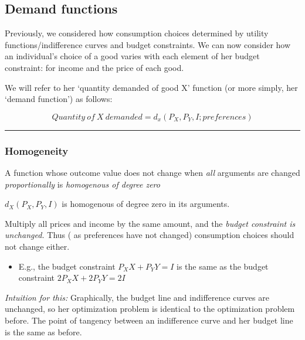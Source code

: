 \documentclass[]{article}
\providecommand{\tightlist}{%
  \setlength{\itemsep}{0pt}\setlength{\parskip}{0pt}}
\begin{document}
\hypertarget{demand-functions}{%
\subsection{Demand functions}\label{demand-functions}}

Previously, we considered how consumption choices determined by utility
functions/indifference curves and budget constraints. We can now
consider how an individual's choice of a good varies with each element
of her budget constraint: for income and the price of each good.

We will refer to her `quantity demanded of good X' function (or more
simply, her `demand function') as follows:

\bigskip

\[Quantity \: of \: X \: demanded = d_x(P_X, P_Y, I; preferences)\]

\begin{center}\rule{0.5\linewidth}{\linethickness}\end{center}

\hypertarget{homogeneity}{%
\subsubsection{Homogeneity}\label{homogeneity}}

\begin{description}
\tightlist
\item[Homogenous (of degree zero) (demand) function]
A function whose outcome value does not change when \emph{all} arguments
are changed \emph{proportionally} is \emph{homogenous of degree zero}
\end{description}

\bigskip

\(d_X(P_X,P_Y,I)\) is homogenous of degree zero in its arguments.

\bigskip

Multiply all prices and income by the same amount, and the \emph{budget
constraint is unchanged.} Thus ( as preferences have not changed)
consumption choices should not change either.

\begin{itemize}
\tightlist
\item
  E.g., the budget constraint \(P_X X + P_Y Y = I\) is the same as the
  budget constraint \(2P_X X + 2P_Y Y = 2I\)
\end{itemize}

\emph{Intuition for this:} Graphically, the budget line and indifference
curves are unchanged, so her optimization problem is identical to the
optimization problem before. The point of tangency between an
indifference curve and her budget line is the same as before.
\end{document}
